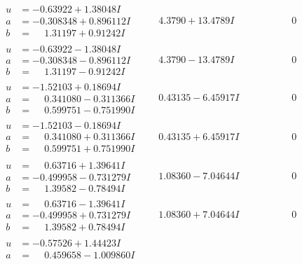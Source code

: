 \documentclass[1p]{elsarticle_modified}
\theoremstyle{definition}
\begin{document}
$$\begin{array}{c|c|c}
 \hline 
\begin{aligned}
u &= -0.63922 + 1.38048 I \\
a &= -0.308348 + 0.896112 I \\
b &= \phantom{-}1.31197 + 0.91242 I\end{aligned}
 & \phantom{-}4.3790 + 13.4789 I & \phantom{-0.000000 } 0 \\ \hline\begin{aligned}
u &= -0.63922 - 1.38048 I \\
a &= -0.308348 - 0.896112 I \\
b &= \phantom{-}1.31197 - 0.91242 I\end{aligned}
 & \phantom{-}4.3790 - 13.4789 I & \phantom{-0.000000 } 0 \\ \hline\begin{aligned}
u &= -1.52103 + 0.18694 I \\
a &= \phantom{-}0.341080 - 0.311366 I \\
b &= \phantom{-}0.599751 - 0.751990 I\end{aligned}
 & \phantom{-}0.43135 - 6.45917 I & \phantom{-0.000000 } 0 \\ \hline\begin{aligned}
u &= -1.52103 - 0.18694 I \\
a &= \phantom{-}0.341080 + 0.311366 I \\
b &= \phantom{-}0.599751 + 0.751990 I\end{aligned}
 & \phantom{-}0.43135 + 6.45917 I & \phantom{-0.000000 } 0 \\ \hline\begin{aligned}
u &= \phantom{-}0.63716 + 1.39641 I \\
a &= -0.499958 - 0.731279 I \\
b &= \phantom{-}1.39582 - 0.78494 I\end{aligned}
 & \phantom{-}1.08360 - 7.04644 I & \phantom{-0.000000 } 0 \\ \hline\begin{aligned}
u &= \phantom{-}0.63716 - 1.39641 I \\
a &= -0.499958 + 0.731279 I \\
b &= \phantom{-}1.39582 + 0.78494 I\end{aligned}
 & \phantom{-}1.08360 + 7.04644 I & \phantom{-0.000000 } 0 \\ \hline\begin{aligned}
u &= -0.57526 + 1.44423 I \\
a &= \phantom{-}0.459658 - 1.009860 I \\

\end{aligned}
\end{array}$$
\end{document}
